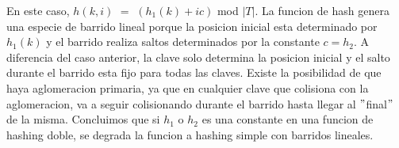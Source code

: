 \documentclass[10pt,a4paper]{article}
\begin{document}
\newline
En este caso, $h(k,i)$ $=$ $(h_{1}(k) + ic)$ mod $|T|$.
\newline 
\newline
La funcion de hash genera una especie de barrido lineal porque la posicion inicial esta determinado por $h_{1}(k)$ y el barrido realiza saltos determinados por la constante $c = h_{2}$. A diferencia del caso anterior, la clave solo determina la posicion inicial y el salto durante el barrido esta fijo para todas las claves.
\newline 
\newline
Existe la posibilidad de que haya aglomeracion primaria, ya que en cualquier clave que colisiona con la aglomeracion, va a seguir colisionando durante el barrido hasta llegar al $"$final$"$ de la misma.
\newline 
\newline
Concluimos que si $h_{1}$ o $h_{2}$ es una constante en una funcion de hashing doble, se degrada la funcion a hashing simple con barridos lineales. 
\end{document}
